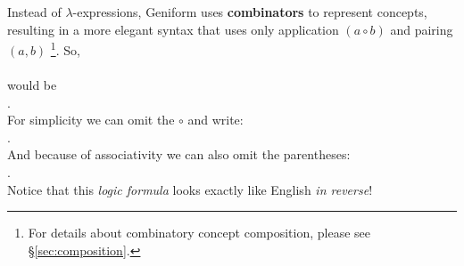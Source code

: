 

Instead of $\lambda$-expressions, Geniform uses \textbf{combinators} to represent concepts, resulting in a more elegant syntax that uses only application $(a \circ b)$ and pairing $(a,b)$ \footnote{For details about combinatory concept composition, please see \S\ref{sec:composition}.}.  So,\\
\tab {}\\
would be\\
\tab {}.\\
For simplicity we can omit the $\circ$ and write:\\
\tab {}.\\
And because of associativity we can also omit the parentheses:\\
\tab {}.\\
Notice that this \textit{logic formula} looks exactly like English \textit{in reverse}!


